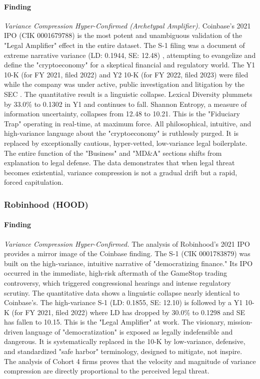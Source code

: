 \documentclass[12pt, letterpaper]{article}
\begin{document}
\paragraph{Finding} \textit{Variance Compression Hyper-Confirmed (Archetypal Amplifier).}
Coinbase's 2021 IPO (CIK 0001679788) is the most potent and unambiguous validation of the "Legal Amplifier" effect in the entire dataset. The S-1 filing was a document of extreme narrative variance (LD: 0.1944, SE: 12.48) \cite{key4, key20}, attempting to evangelize and define the "cryptoeconomy" for a skeptical financial and regulatory world. The Y1 10-K (for FY 2021, filed 2022) \cite{key54} and Y2 10-K (for FY 2022, filed 2023) \cite{key53, key55} were filed while the company was under active, public investigation and litigation by the SEC \cite{key56, key57}. The quantitative result is a linguistic collapse. Lexical Diversity plummets by 33.0\% to 0.1302 in Y1 and continues to fall. Shannon Entropy, a measure of information uncertainty, collapses from 12.48 to 10.21. This is the "Fiduciary Trap" operating in real-time, at maximum force. All philosophical, intuitive, and high-variance language about the "cryptoeconomy" is ruthlessly purged. It is replaced by exceptionally cautious, hyper-vetted, low-variance legal boilerplate. The entire function of the "Business" and "MD\&A" sections shifts from explanation to legal defense. The data demonstrates that when legal threat becomes existential, variance compression is not a gradual drift but a rapid, forced capitulation.

\subsubsection{Robinhood (HOOD)}
\paragraph{Finding} \textit{Variance Compression Hyper-Confirmed.}
The analysis of Robinhood's 2021 IPO provides a mirror image of the Coinbase finding. The S-1 (CIK 0001783879) was built on the high-variance, intuitive narrative of "democratizing finance." Its IPO occurred in the immediate, high-risk aftermath of the GameStop trading controversy, which triggered congressional hearings and intense regulatory scrutiny. The quantitative data shows a linguistic collapse nearly identical to Coinbase's. The high-variance S-1 (LD: 0.1855, SE: 12.10) is followed by a Y1 10-K (for FY 2021, filed 2022) where LD has dropped by 30.0\% to 0.1298 and SE has fallen to 10.15. This is the "Legal Amplifier" at work. The visionary, mission-driven language of "democratization" is exposed as legally indefensible and dangerous. It is systematically replaced in the 10-K by low-variance, defensive, and standardized "safe harbor" terminology, designed to mitigate, not inspire. The analysis of Cohort 4 firms proves that the velocity and magnitude of variance compression are directly proportional to the perceived legal threat.
\end{document}
